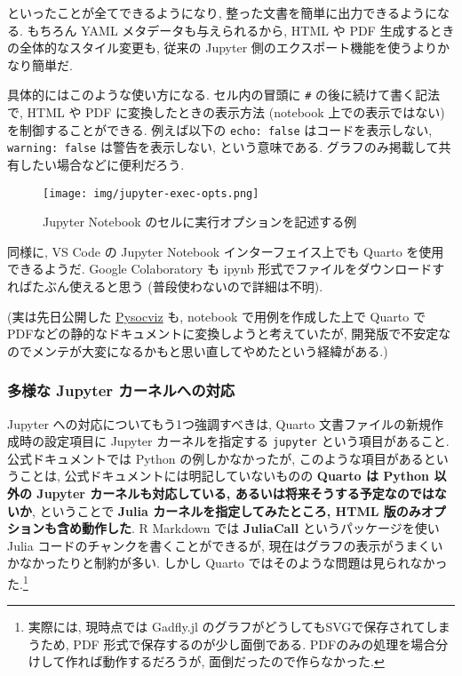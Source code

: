 \documentclass[
  letterpaper,
  DIV=11,
  pandoc,
  ja=standard,
  jafont=noto-otf]{bxjsarticle}
\begin{document}
といったことが全てできるようになり,
整った文書を簡単に出力できるようになる. もちろん YAML
メタデータも与えられるから, HTML や PDF
生成するときの全体的なスタイル変更も, 従来の Jupyter
側のエクスポート機能を使うよりかなり簡単だ.

具体的にはこのような使い方になる. セル内の冒頭に \texttt{\#\textbar{}}
の後に続けて書く記法で, HTML や PDF に変換したときの表示方法 (notebook
上での表示ではない) を制御することができる. 例えば以下の
\texttt{echo:\ false} はコードを表示しない, \texttt{warning:\ false}
は警告を表示しない, という意味である.
グラフのみ掲載して共有したい場合などに便利だろう.

\begin{figure}

{\centering 

\texttt{[image: img/jupyter-exec-opts.png]}

}

\caption{\label{fig-jupyter-exec-opts}Jupyter Notebook
のセルに実行オプションを記述する例}

\end{figure}

同様に, VS Code の Jupyter Notebook インターフェイス上でも Quarto
を使用できるようだ. Google Colaboratory も ipynb
形式でファイルをダウンロードすればたぶん使えると思う
(普段使わないので詳細は不明).

(実は先日公開した
\href{https://ill-identified.hatenablog.com/entry/2021/08/06/200859}{Pysocviz}
も, notebook で用例を作成した上で Quarto で
PDFなどの静的なドキュメントに変換しようと考えていたが,
開発版で不安定なのでメンテが大変になるかもと思い直してやめたという経緯がある.)

\hypertarget{ux591aux69d8ux306a-jupyter-ux30abux30fcux30cdux30ebux3078ux306eux5bfeux5fdc}{%
\subsubsection{多様な Jupyter
カーネルへの対応}\label{ux591aux69d8ux306a-jupyter-ux30abux30fcux30cdux30ebux3078ux306eux5bfeux5fdc}}

Jupyter への対応についてもう1つ強調すべきは, Quarto
文書ファイルの新規作成時の設定項目に Jupyter カーネルを指定する
\texttt{jupyter} という項目があること. 公式ドキュメントでは Python
の例しかなかったが, このような項目があるということは,
公式ドキュメントには明記していないものの \textbf{Quarto は Python 以外の
Jupyter カーネルも対応している, あるいは将来そうする予定なのではないか},
ということで \textbf{Julia カーネルを指定してみたところ, HTML
版のみオプションも含め動作した}. R Markdown では \textbf{JuliaCall}
というパッケージを使い Julia コードのチャンクを書くことができるが,
現在はグラフの表示がうまくいかなかったりと制約が多い. しかし Quarto
ではそのような問題は見られなかった.\footnote{実際には, 現時点では
  Gadfly.jl のグラフがどうしてもSVGで保存されてしまうため, PDF
  形式で保存するのが少し面倒である.
  PDFのみの処理を場合分けして作れば動作するだろうが,
  面倒だったので作らなかった.}
\end{document}
